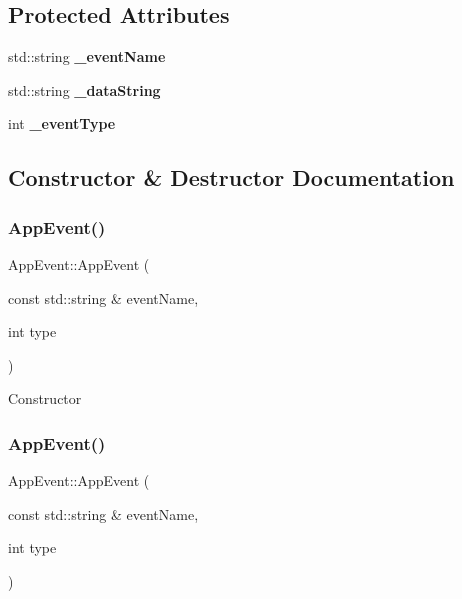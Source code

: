 \subsection*{Protected Attributes}
\begin{DoxyCompactItemize}
\item 
\mbox{\label{classAppEvent_a111fa1d45bd0cad1f0ff27f070d346ff}} 
std\+::string {\bfseries \+\_\+event\+Name}
\item 
\mbox{\label{classAppEvent_a309b50fcf3a70e21d67fdae5bdd38101}} 
std\+::string {\bfseries \+\_\+data\+String}
\item 
\mbox{\label{classAppEvent_a6398c1e8550e5beaab269ff98575de43}} 
int {\bfseries \+\_\+event\+Type}
\end{DoxyCompactItemize}


\subsection{Constructor \& Destructor Documentation}
\mbox{\label{classAppEvent_ad4f8b5ceebce8b4f5daa7e8cae41d234}} 
\subsubsection{\texorpdfstring{App\+Event()}{AppEvent()}\hspace{0.1cm}{\footnotesize\ttfamily [1/2]}}
{\footnotesize\ttfamily App\+Event\+::\+App\+Event (\begin{DoxyParamCaption}\item[{const std\+::string \&}]{event\+Name,  }\item[{int}]{type }\end{DoxyParamCaption})}

Constructor \mbox{\label{classAppEvent_ad4f8b5ceebce8b4f5daa7e8cae41d234}} 
\subsubsection{\texorpdfstring{App\+Event()}{AppEvent()}\hspace{0.1cm}{\footnotesize\ttfamily [2/2]}}
{\footnotesize\ttfamily App\+Event\+::\+App\+Event (\begin{DoxyParamCaption}\item[{const std\+::string \&}]{event\+Name,  }\item[{int}]{type }\end{DoxyParamCaption})}

